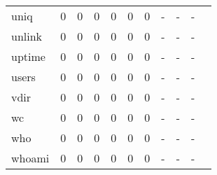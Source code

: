 \begin{longtable}{lp{1.10cm}p{1.10cm}p{1.10cm}p{1.10cm}p{1.10cm}p{1.10cm}p{1.10cm}p{1.10cm}p{1.10cm}p{1.10cm}}
uniq      &                      0 &                                  0 &                                 0 &                                0 &                                 0 &                               0 &                              - &                                     - &                                   - \\
unlink    &                      0 &                                  0 &                                 0 &                                0 &                                 0 &                               0 &                              - &                                     - &                                   - \\
uptime    &                      0 &                                  0 &                                 0 &                                0 &                                 0 &                               0 &                              - &                                     - &                                   - \\
users     &                      0 &                                  0 &                                 0 &                                0 &                                 0 &                               0 &                              - &                                     - &                                   - \\
vdir      &                      0 &                                  0 &                                 0 &                                0 &                                 0 &                               0 &                              - &                                     - &                                   - \\
wc        &                      0 &                                  0 &                                 0 &                                0 &                                 0 &                               0 &                              - &                                     - &                                   - \\
who       &                      0 &                                  0 &                                 0 &                                0 &                                 0 &                               0 &                              - &                                     - &                                   - \\
whoami    &                      0 &                                  0 &                                 0 &                                0 &                                 0 &                               0 &                              - &                                     - &                                   - \\

\end{longtable}
